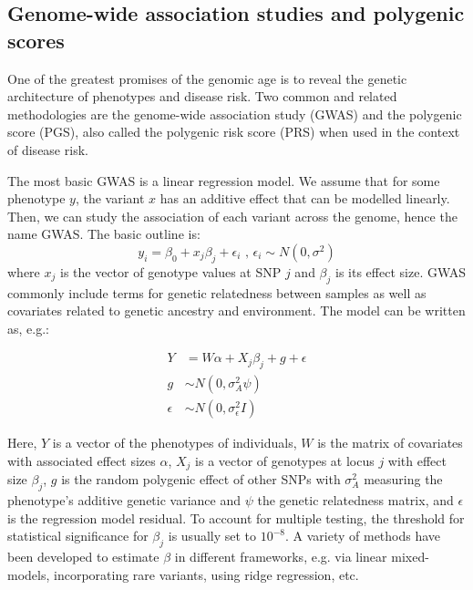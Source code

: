 \subsection{Genome-wide association studies and polygenic scores}

One of the greatest promises of the genomic age is to reveal the genetic architecture of phenotypes and disease risk. Two common and related methodologies are the genome-wide association study (GWAS) and the polygenic score (PGS), also called the polygenic risk score (PRS) when used in the context of disease risk.

The most basic GWAS is a linear regression model. We assume that for some phenotype $y$, the variant $x$ has an additive effect that can be modelled linearly. Then, we can study the association of each variant across the genome, hence the name GWAS. The basic outline is: $$ y_{i} = \beta_0 + x_{j}\beta_{j} + \epsilon_{i} \text{ , } \epsilon_{i} \sim N(0,\sigma^{2})  $$ where $x_{j}$ is the vector of genotype values at SNP $j$ and $\beta_{j}$ is its effect size. GWAS commonly include terms for genetic relatedness between samples as well as covariates related to genetic ancestry and environment. The model can be written as, e.g.\citep{uffelmann_genome-wide_2021}:

\begin{singlespace}
\begin{align*} 
Y & = W\alpha + X_{j}\beta_{j} + g + \epsilon \\
g & \sim N(0,\sigma^{2}_{A}\psi) \\
\epsilon & \sim N(0,\sigma^{2}_{\epsilon}I)
\end{align*} 
\end{singlespace}
\noindent Here, $Y$ is a vector of the phenotypes of individuals, $W$ is the matrix of covariates with associated effect sizes $\alpha$, $X_{j}$ is a vector of genotypes at locus $j$ with effect size $\beta_{j}$, $g$ is the random polygenic effect of other SNPs with $\sigma^{2}_{A}$ measuring the phenotype's additive genetic variance and $\psi$ the genetic relatedness matrix, and $\epsilon$ is the regression model residual. To account for multiple testing, the threshold for statistical significance for $\beta_{j}$ is usually set to $10^{-8}$. A variety of methods have been developed to estimate $\beta$ in different frameworks, e.g. via linear mixed-models\citep{loh_mixed-model_2018}, incorporating rare variants\citep{zhou_saige-gene_2022}, using ridge regression\citep{mbatchou_computationally_2021}, etc.

